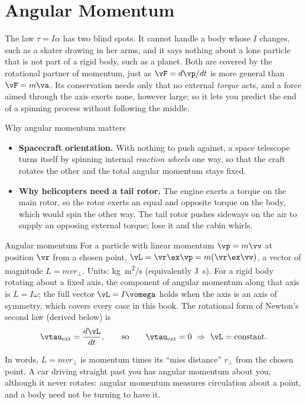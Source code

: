 \section{Angular Momentum}\label{sec:angmom14}

The law $\tau=I\alpha$ has two blind spots. It cannot handle a body whose $I$ changes, such as a skater
drawing in her arms, and it says nothing about a lone particle that is not part of a rigid body, such as a
planet. Both are covered by the rotational partner of momentum, just as $\vF=d\vp/dt$ is more general than
$\vF=m\va$. Its conservation needs only that no external \emph{torque} acts, and a force aimed through the
axis exerts none, however large; so it lets you predict the end of a spinning process without following
the middle.

\begin{motivbox}{Why angular momentum matters}
\begin{itemize}
\item \textbf{Spacecraft orientation.} With nothing to push against, a space telescope turns itself
by spinning internal \emph{reaction wheels} one way, so that the craft rotates the other and the total
angular momentum stays fixed.
\item \textbf{Why helicopters need a tail rotor.} The engine exerts a torque on the main rotor, so the
rotor exerts an equal and opposite torque on the body, which would spin the other way. The tail rotor
pushes sideways on the air to supply an opposing external torque; lose it and the cabin whirls.
\end{itemize}
\end{motivbox}

\begin{defbox}{Angular momentum}
For a particle with linear momentum $\vp=m\vv$ at position $\vr$ from a chosen point,
$\vL=\vr\ex\vp=m(\vr\ex\vv)$, a vector of magnitude $L=mvr_\perp$. Units: \si{kg.m^2/s} (equivalently
\si{J.s}). For a rigid body rotating about a
fixed axis, the component of angular momentum along that axis is $L=I\omega$; the full vector $\vL=I\vomega$
holds when the axis is an axis of symmetry, which covers every case in this book. The rotational form of
Newton's second law (derived below) is
\[
\vtau_{\text{ext}}=\frac{d\vL}{dt},\qquad\text{so}\qquad \vtau_{\text{ext}}=0\ \Rightarrow\ \vL=\text{constant}.
\]
\end{defbox}

In words, $L=mvr_\perp$ is momentum times its ``miss distance'' $r_\perp$ from the chosen point. A car
driving straight past you has angular momentum about you, although it never rotates: angular momentum
measures circulation about a point, and a body need not be turning to have it.

